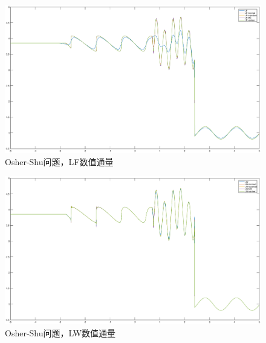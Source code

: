 \documentclass[a4paper,  11pt]{ctexart}
\begin{document}
\begin{figure}[H]
  \begin{center}
\includegraphics[width=\textwidth]{./images/EulerShu-LF.eps}
    \caption{Osher-Shu问题，LF数值通量}
  \end{center}
\end{figure}

\begin{figure}[H]
  \begin{center}
\includegraphics[width=\textwidth]{./images/EulerShu-LW.eps}
    \caption{Osher-Shu问题，LW数值通量}
  \end{center}
\end{figure}
\end{document}
